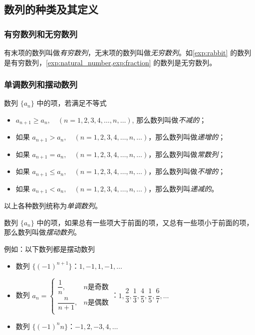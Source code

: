 \subsection{数列的种类及其定义}
\subsubsection{有穷数列和无穷数列}
有末项的数列叫做\emph{有穷数列}，无末项的数列叫做\emph{无穷数列}。如\cref{exp:rabbit} 的数列是有穷数列，\cref{exp:natural_number,exp:fraction} 的数列是无穷数列。

\subsubsection{单调数列和摆动数列}

数列 $\{a_n\}$ 中的项，若满足不等式
\begin{itemize}
  \item $a_{n+1}\geqslant a_n,\quad (n=1,2,3,4,\ldots,n,\ldots)$, 那么数列叫做\emph{不减的}； 
  \item 如果 $a_{n+1}> a_n,\quad (n=1,2,3,4,\ldots,n,\ldots)$，那么数列叫做\emph{递增的}；
  \item 如果 $a_{n+1}= a_n,\quad (n=1,2,3,4,\ldots,n,\ldots)$，那么数列叫做\emph{常数列}；
  \item 如果 $a_{n+1}\leqslant a_n,\quad (n=1,2,3,4,\ldots,n,\ldots)$，那么数列叫做\emph{不增的}；
  \item 如果 $a_{n+1}< a_n,\quad (n=1,2,3,4,\ldots,n,\ldots)$，那么数列叫\emph{递减的}。
\end{itemize}

以上各种数列统称为\emph{单调数列}。

数列 $\{a_n\}$ 中的项，如果总有一些项大于前面的项，又总有一些项小于前面的项，那么数列叫做\emph{摆动数列}。

例如：以下数列都是摆动数列
\begin{itemize}
  \item 数列 $\{(-1)^{n+1}\}$：$1,-1,1,-1,\ldots$
  \item 数列 $a_n=\begin{cases}
    \dfrac{1}{n}, & \text{$n$是奇数}\\
    \dfrac{n}{n+1}, & \text{$n$是偶数}\\
  \end{cases}$：$1,\dfrac{2}{3},\dfrac{1}{3},\dfrac{4}{5},\dfrac{1}{5},\dfrac{6}{7},\ldots$
  \item 数列 $\{(-1)^{n}n\}$：$-1,2,-3,4,\ldots$
\end{itemize}

